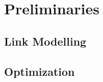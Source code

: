 \chapter{Preliminaries}
%
%
\section{Link Modelling}\label{sec:linkmodel}

\section{Optimization}\label{sec:optimization}


